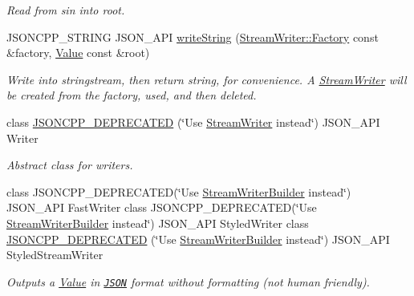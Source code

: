 \begin{DoxyCompactItemize}
\begin{DoxyCompactList}\small\item\em Read from \textquotesingle{}sin\textquotesingle{} into \textquotesingle{}root\textquotesingle{}. \end{DoxyCompactList}\item 
\mbox{\label{namespaceJson_a00820c0084189e2a7533531c0f250e3f}} 
J\+S\+O\+N\+C\+P\+P\+\_\+\+S\+T\+R\+I\+NG J\+S\+O\+N\+\_\+\+A\+PI \hyperlink{namespaceJson_a00820c0084189e2a7533531c0f250e3f}{write\+String} (\hyperlink{classJson_1_1StreamWriter_1_1Factory}{Stream\+Writer\+::\+Factory} const \&factory, \hyperlink{classJson_1_1Value}{Value} const \&root)
\begin{DoxyCompactList}\small\item\em Write into stringstream, then return string, for convenience. A \hyperlink{classJson_1_1StreamWriter}{Stream\+Writer} will be created from the factory, used, and then deleted. \end{DoxyCompactList}\item 
class \hyperlink{namespaceJson_a677dd20047c0c6e4eb16c5f1b53f703c}{J\+S\+O\+N\+C\+P\+P\+\_\+\+D\+E\+P\+R\+E\+C\+A\+T\+ED} (\char`\"{}Use \hyperlink{classJson_1_1StreamWriter}{Stream\+Writer} instead\char`\"{}) J\+S\+O\+N\+\_\+\+A\+PI Writer
\begin{DoxyCompactList}\small\item\em Abstract class for writers. \end{DoxyCompactList}\item 
class J\+S\+O\+N\+C\+P\+P\+\_\+\+D\+E\+P\+R\+E\+C\+A\+T\+ED(\char`\"{}Use \hyperlink{classJson_1_1StreamWriterBuilder}{Stream\+Writer\+Builder} instead\char`\"{}) J\+S\+O\+N\+\_\+\+A\+PI Fast\+Writer class J\+S\+O\+N\+C\+P\+P\+\_\+\+D\+E\+P\+R\+E\+C\+A\+T\+ED(\char`\"{}Use \hyperlink{classJson_1_1StreamWriterBuilder}{Stream\+Writer\+Builder} instead\char`\"{}) J\+S\+O\+N\+\_\+\+A\+PI Styled\+Writer class \hyperlink{namespaceJson_a9013c5f4f4ff260225b101a18af45262}{J\+S\+O\+N\+C\+P\+P\+\_\+\+D\+E\+P\+R\+E\+C\+A\+T\+ED} (\char`\"{}Use \hyperlink{classJson_1_1StreamWriterBuilder}{Stream\+Writer\+Builder} instead\char`\"{}) J\+S\+O\+N\+\_\+\+A\+PI Styled\+Stream\+Writer
\begin{DoxyCompactList}\small\item\em Outputs a \hyperlink{classJson_1_1Value}{Value} in \href{http://www.json.org}{\tt J\+S\+ON} format without formatting (not human friendly). \end{DoxyCompactList}\item 

\end{DoxyCompactItemize}
